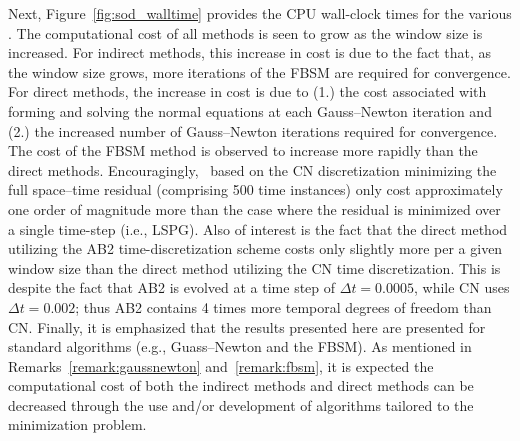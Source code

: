 Next, Figure~\ref{fig:sod_walltime} provides the CPU wall-clock times for the various \methodAcronymROMs. The computational cost of all methods is seen to grow 
as the window size is increased. For indirect methods, this increase in cost is due to the fact that, as the window size 
grows, more iterations of the FBSM are required for convergence. For direct methods, the increase in cost is due to (1.) the cost 
associated with forming and solving the normal equations at each Gauss--Newton iteration and (2.) the increased number of 
Gauss--Newton iterations required for convergence. The cost of the FBSM method is observed to increase more rapidly 
than the direct methods. Encouragingly, \methodAcronymROMs\ based on the CN discretization
minimizing the full space--time residual (comprising 
500 time instances) only  
cost approximately one order of magnitude more than the case where the residual is minimized over a single time-step (i.e., LSPG). Also of interest is the 
fact that the direct method utilizing the AB2 time-discretization scheme costs only slightly more per a given window size than the direct method 
utilizing the CN time discretization. This is despite the fact that AB2 is evolved at a time step of $\Delta t = 0.0005$, while CN uses $\Delta t = 0.002$; thus 
AB2 contains 4 times more temporal degrees of freedom than CN.  Finally, it is emphasized that the 
results presented here are presented for standard algorithms (e.g., Guass--Newton and the FBSM). As mentioned in 
Remarks~\ref{remark:gaussnewton} and~\ref{remark:fbsm}, it is expected the computational cost 
of both the indirect methods and direct methods can be decreased through the use and/or development of 
algorithms tailored to the minimization problem. 


